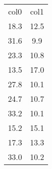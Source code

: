 \begin{table}
\begin{tabular}{cc}
col0 & col1 \\
18.3 & 12.5 \\
31.6 & 9.9 \\
23.3 & 10.8 \\
13.5 & 17.0 \\
27.8 & 10.1 \\
24.7 & 10.7 \\
33.2 & 10.1 \\
15.2 & 15.1 \\
17.3 & 13.3 \\
33.0 & 10.2 \\
\end{tabular}
\end{table}
